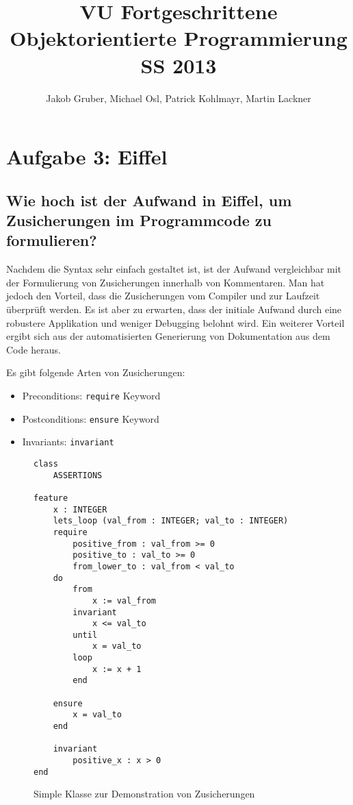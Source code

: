 \documentclass[a4paper,10pt]{article}
\title{VU Fortgeschrittene Objektorientierte Programmierung \\
       SS 2013}
\author{Jakob Gruber,
        Michael Osl,
        Patrick Kohlmayr,
        Martin Lackner}
\begin{document}
\maketitle

\section{Aufgabe 3: Eiffel}


\subsection{Wie hoch ist der Aufwand in Eiffel, um Zusicherungen im Programmcode zu 
formulieren?}

\vspace{3mm}

Nachdem die Syntax sehr einfach gestaltet ist, ist der Aufwand vergleichbar mit der Formulierung von Zusicherungen innerhalb von Kommentaren. Man hat jedoch den Vorteil, dass die Zusicherungen vom Compiler und zur Laufzeit \"uberpr\"uft werden. Es ist aber zu erwarten, dass der initiale Aufwand durch eine robustere Applikation und weniger Debugging belohnt wird. Ein weiterer Vorteil ergibt sich aus der automatisierten Generierung von Dokumentation aus dem Code heraus.

Es gibt folgende Arten von Zusicherungen:

\begin{itemize}
    \item Preconditions: \verb+require+ Keyword
    \item Postconditions: \verb+ensure+ Keyword
    \item Invariants: \verb+invariant+
\end{itemize}

\begin{figure}
\begin{lstlisting}
class
    ASSERTIONS 

feature
    x : INTEGER
    lets_loop (val_from : INTEGER; val_to : INTEGER)
    require
        positive_from : val_from >= 0
        positive_to : val_to >= 0
        from_lower_to : val_from < val_to
    do
        from
            x := val_from
        invariant
            x <= val_to
        until
            x = val_to
        loop
            x := x + 1
        end

    ensure
        x = val_to
    end

    invariant
        positive_x : x > 0
end
\end{lstlisting}
\label{lst:assertprog}
\caption{Simple Klasse zur Demonstration von Zusicherungen}
\end{figure}
\end{document}
